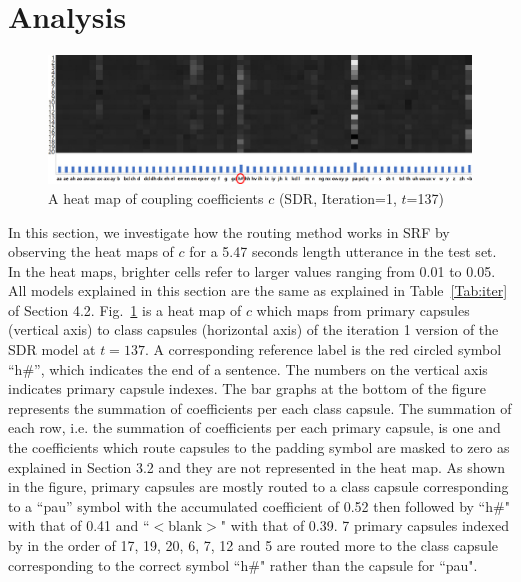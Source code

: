 \documentclass[review]{elsarticle}
\begin{document}
\section{Analysis}
\begin{figure}[ht!]
  \includegraphics[trim={0 0cm 0 0cm}, clip, width=1.0 \linewidth]{05_coupling_coefficient_map.jpg}
  \caption{A heat map of coupling coefficients $c$ (SDR, Iteration=1, $t$=137)}
  \label{fig:cc}
\end{figure}
In this section, we investigate how the routing method works in SRF by observing the heat maps of $c$ for a 5.47 seconds length utterance in the test set.
In the heat maps, brighter cells refer to larger values ranging from 0.01 to 0.05.
All models explained in this section are the same as explained in Table~\ref{Tab:iter} of Section 4.2.
Fig.~\ref{fig:cc} is a heat map of $c$ which maps from primary capsules (vertical axis) to class capsules (horizontal axis) of the iteration 1 version of the SDR model at $t=137$.
A corresponding reference label is the red circled symbol ``h\#”, which indicates the end of a sentence.
The numbers on the vertical axis indicates primary capsule indexes.
The bar graphs at the bottom of the figure represents the summation of coefficients per each class capsule.
The summation of each row, i.e. the summation of coefficients per each primary capsule, is one and the coefficients which route capsules to the padding symbol are masked to zero as explained in Section 3.2 and they are not represented in the heat map.
As shown in the figure, primary capsules are mostly routed to a class capsule corresponding to a ``pau” symbol with the accumulated coefficient of 0.52 then followed by ``h\#" with that of 0.41 and ``$<$blank$>$" with that of 0.39.
7 primary capsules indexed by in the order of 17, 19, 20, 6, 7, 12 and 5 are routed more to the class capsule corresponding to the correct symbol ``h\#" rather than the capsule for ``pau".
\end{document}

